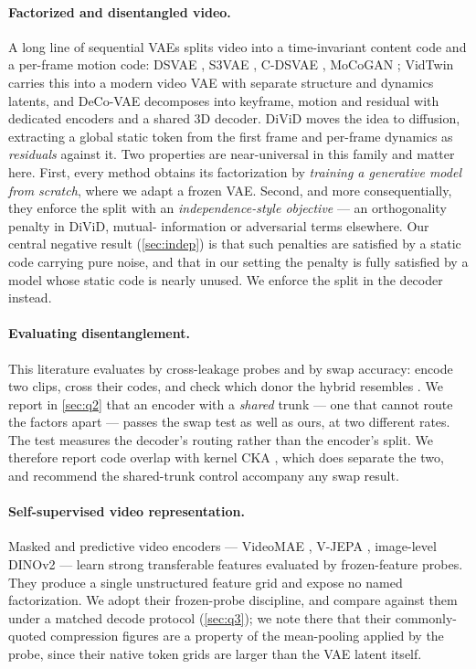 
\paragraph{Factorized and disentangled video.}
A long line of sequential VAEs splits video into a time-invariant content code and a
per-frame motion code: DSVAE \citep{dsvae}, S3VAE \citep{s3vae}, C-DSVAE \citep{cdsvae},
MoCoGAN \citep{mocogan}; VidTwin \citep{vidtwin} carries this into a modern video VAE
with separate structure and dynamics latents, and DeCo-VAE \citep{decovae} decomposes
into keyframe, motion and residual with dedicated encoders and a shared 3D decoder.
DiViD \citep{divid} moves the idea to diffusion, extracting a global static token from
the first frame and per-frame dynamics as \emph{residuals} against it. Two properties
are near-universal in this family and matter here. First, every method obtains its
factorization by \emph{training a generative model from scratch}, where we adapt a
frozen VAE. Second, and more consequentially, they enforce the split with an
\emph{independence-style objective} --- an orthogonality penalty in DiViD, mutual-
information or adversarial terms elsewhere. Our central negative result
(\cref{sec:indep}) is that such penalties are satisfied by a static code carrying pure
noise, and that in our setting the penalty is fully satisfied by a model whose static
code is nearly unused. We enforce the split in the decoder instead.

\paragraph{Evaluating disentanglement.}
This literature evaluates by cross-leakage probes and by swap accuracy: encode two
clips, cross their codes, and check which donor the hybrid resembles \citep{s3vae,
cdsvae,divid}. We report in \cref{sec:q2} that an encoder with a \emph{shared} trunk ---
one that cannot route the factors apart --- passes the swap test as well as ours, at two
different rates. The test measures the decoder's routing rather than the encoder's
split. We therefore report code overlap with kernel CKA \citep{cka}, which does separate
the two, and recommend the shared-trunk control accompany any swap result.

\paragraph{Self-supervised video representation.}
Masked and predictive video encoders --- VideoMAE \citep{videomae}, V-JEPA
\citep{vjepa}, image-level DINOv2 \citep{dinov2} --- learn strong transferable features
evaluated by frozen-feature probes. They produce a single unstructured feature grid and
expose no named factorization. We adopt their frozen-probe discipline, and compare
against them under a matched decode protocol (\cref{sec:q3}); we note there that their
commonly-quoted compression figures are a property of the mean-pooling applied by the
probe, since their native token grids are larger than the VAE latent itself.

